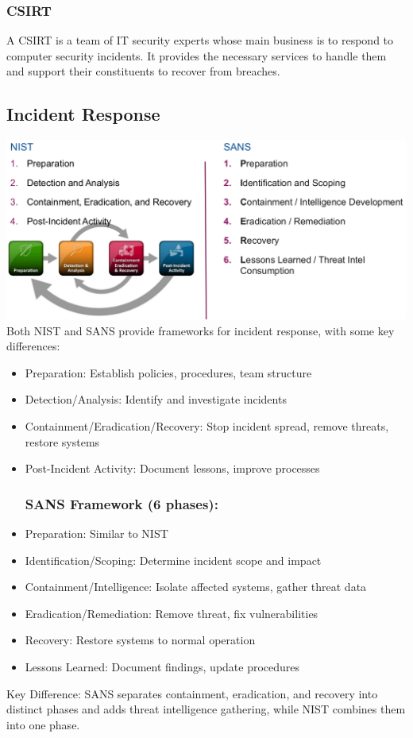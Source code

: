 \subsubsection*{CSIRT}
A CSIRT is a team of IT security experts whose main business is to respond to computer security incidents. It provides the necessary services to handle them and support their constituents to recover from breaches.

\subsection{Incident Response}
\includegraphics[width=\textwidth]{resources/04-incident-reponse.png}
Both NIST and SANS provide frameworks for incident response, with some key differences:
\begin{itemize}
  \subsubsection*{NIST Framework (4 phases):}
  \item Preparation: Establish policies, procedures, team structure
  \item Detection/Analysis: Identify and investigate incidents
  \item Containment/Eradication/Recovery: Stop incident spread, remove threats, restore systems
  \item Post-Incident Activity: Document lessons, improve processes
  \subsubsection*{SANS Framework (6 phases):}
  \item Preparation: Similar to NIST
  \item Identification/Scoping: Determine incident scope and impact
  \item Containment/Intelligence: Isolate affected systems, gather threat data
  \item Eradication/Remediation: Remove threat, fix vulnerabilities
  \item Recovery: Restore systems to normal operation
  \item Lessons Learned: Document findings, update procedures
\end{itemize}
Key Difference: SANS separates containment, eradication, and recovery into distinct phases and adds threat intelligence gathering, while NIST combines them into one phase.

